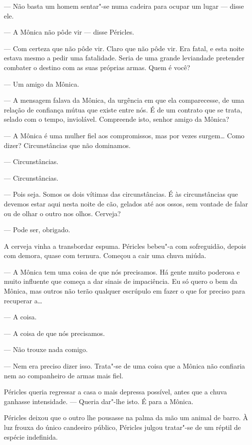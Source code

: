 --- Não basta um homem sentar"-se numa cadeira para ocupar um lugar ---
  disse ele.

--- A Mônica não pôde vir --- disse Péricles.

--- Com certeza que não pôde vir. Claro que não pôde vir. Era fatal, e
  esta noite estava mesmo a pedir uma fatalidade.
Seria de uma grande leviandade pretender combater o destino com as suas
próprias armas. Quem é você?

--- Um amigo da Mônica.

--- A mensagem falava da Mônica, da urgência em que ela comparecesse, de
  uma relação de confiança mútua que existe entre nós. É de um contrato
  que se trata, selado com o tempo, inviolável. Compreende isto, senhor
  amigo da Mônica?

--- A Mônica é uma mulher fiel aos compromissos, mas por vezes surgem\ldots{}
  Como dizer? Circunstâncias que não dominamos.

--- Circunstâncias.

--- Circunstâncias.

--- Pois seja. Somos os dois vítimas das circunstâncias. É às
  circunstâncias que devemos estar aqui nesta noite de cão, gelados até
  aos ossos, sem vontade de falar ou de olhar o outro nos olhos.
  Cerveja?

--- Pode ser, obrigado.

A cerveja vinha a transbordar espuma. Péricles bebeu"-a com sofreguidão,
depois com demora, quase com ternura. Começou a cair uma chuva miúda.

--- A Mônica tem uma coisa de que nós precisamos. Há gente muito poderosa
  e muito influente que começa a dar sinais de impaciência. Eu só
  quero o bem da Mônica, mas outros não terão qualquer escrúpulo em
  fazer o que for preciso para recuperar a\ldots{}

--- A coisa.

--- A coisa de que nós precisamos.

--- Não trouxe nada comigo.

--- Nem era preciso dizer isso. Trata"-se de uma coisa que a Mônica não
  confiaria nem ao companheiro de armas mais fiel.

  Péricles queria
  regressar a casa o mais depressa possível, antes que a chuva ganhasse intensidade. --- Queria dar"-lhe isto. É para
a Mônica.

Péricles deixou que o outro lhe pousasse na palma da mão um animal de
barro. À luz frouxa do único candeeiro público, Péricles julgou
tratar"-se de um réptil de espécie indefinida.

